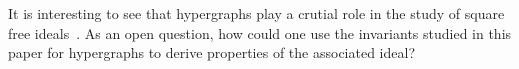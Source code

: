 \documentclass[ALCO,ThmDefs,Unicode,epreuves]{cedram}
\begin{document}
\begin{rema} It is interesting to see that hypergraphs play a crutial role in the study of square free ideals~\cite{KNM:2013}. 
As an open question, how could one use the invariants studied in this paper for hypergraphs to derive properties of the associated ideal?
\end{rema}






\end{document}
